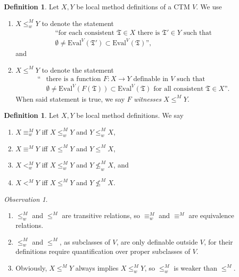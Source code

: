 \documentclass[12pt, twoside]{memoir}
\numberwithin{equation}{section}
\theoremstyle{definition}
\newtheorem{defi}[thm]{Definition}
\theoremstyle{remark}
\newtheorem{ob}[thm]{Observation}
\theoremstyle{definition}
\theoremstyle{definition}
\theoremstyle{definition}
\theoremstyle{remark}
\begin{document}
\begin{defi}
Let $X, Y$ be local method definitions of a CTM $V$. We use 
\begin{enumerate}[label=(\arabic*)]
    \item $X \leq^M_w Y$ to denote the statement
    \begin{gather*}
        \text{``for each consistent } \mathfrak{T} \in X \text{ there is } \mathfrak{T}' \in Y \text{ such that} \\
        \emptyset \neq \mathrm{Eval}^V(\mathfrak{T}') \subset \mathrm{Eval}^V(\mathfrak{T}) \text{'',}
    \end{gather*}
    and
    \item $X \leq^M Y$ to denote the statement
    \begin{align*}
        \text{``} & \text{there is a function } F : X \longrightarrow Y \text{ definable in } V \text{ such that} \\ 
        & \emptyset \neq \mathrm{Eval}^V(F(\mathfrak{T})) \subset \mathrm{Eval}^V(\mathfrak{T}) \text{ for all consistent } \mathfrak{T} \in X \text{''.}
    \end{align*}
    When said statement is true, we say $F$ \emph{witnesses} $X \leq^M Y$.
\end{enumerate}
\end{defi}

\begin{defi}
Let $X, Y$ be local method definitions. We say
\begin{enumerate}[label=(\arabic*)]
    \item $X \equiv^M_w Y$ iff $X \leq^M_w Y$ and $Y \leq^M_w X$,
    \item $X \equiv^M Y$ iff $X \leq^M Y$ and $Y \leq^M X$,
    \item $X <^M_w Y$ iff $X \leq^M_w Y$ and $Y \not\leq^M_w X$, and
    \item $X <^M Y$ iff $X \leq^M Y$ and $Y \not\leq^M X$.
\end{enumerate}
\end{defi}

\begin{ob}
\leavevmode
\begin{enumerate}[label=(\arabic*)]
    \item $\leq^M_w$ and $\leq^M$ are transitive relations, so $\equiv^M_w$ and $\equiv^M$ are equivalence relations.
    \item $\leq^M_w$ and $\leq^M$, as subclasses of $V$, are only definable outside $V$, for their definitions require quantification over proper subclasses of $V$. 
    \item Obviously, $X \leq^M Y$ always implies $X \leq^M_w Y$, so $\leq^M_w$ is weaker than $\leq^M$. 
\end{enumerate}
\end{ob}
\end{document}
